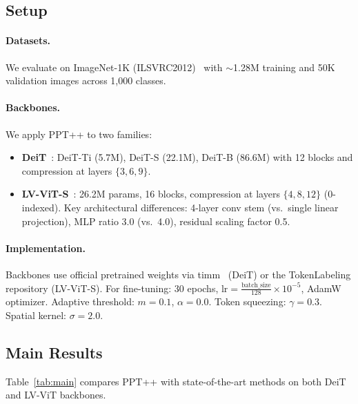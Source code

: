 \documentclass[10pt,twocolumn,letterpaper]{article}
\begin{document}
\subsection{Setup}

\paragraph{Datasets.} We evaluate on ImageNet-1K (ILSVRC2012)~\cite{deng2009imagenet}
with $\sim$1.28M training and 50K validation images across 1,000 classes.

\paragraph{Backbones.} We apply PPT++ to two families:
\begin{itemize}
\item \textbf{DeiT}~\cite{touvron2021deit}: DeiT-Ti (5.7M), DeiT-S (22.1M),
DeiT-B (86.6M) with 12 blocks and compression at layers $\{3, 6, 9\}$.
\item \textbf{LV-ViT-S}~\cite{jiang2021lvvit}: 26.2M params, 16 blocks, 
compression at layers $\{4, 8, 12\}$ (0-indexed). Key architectural differences:
4-layer conv stem (vs.\ single linear projection), MLP ratio 3.0 (vs.\ 4.0),
residual scaling factor 0.5.
\end{itemize}

\paragraph{Implementation.} Backbones use official pretrained weights via
timm~\cite{rw2019timm} (DeiT) or the TokenLabeling repository (LV-ViT-S).
For fine-tuning: 30 epochs, $\text{lr} = \frac{\text{batch\_size}}{128} \times 10^{-5}$,
AdamW optimizer. Adaptive threshold: $m=0.1$, $\alpha=0.0$. Token squeezing:
$\gamma=0.3$. Spatial kernel: $\sigma=2.0$.


\subsection{Main Results}

Table~\ref{tab:main} compares PPT++ with state-of-the-art methods on both
DeiT and LV-ViT backbones.
\end{document}
